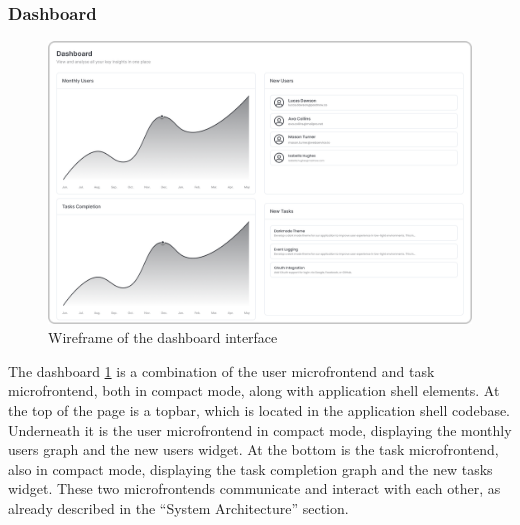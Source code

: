 \subsubsection*{Dashboard}
\begin{figure}[h]
    \centerline{\includegraphics[width=1\textwidth]{images/wireframes/dashboard.png}}
    \caption[Dashboard wireframe]{Wireframe of the dashboard interface}
    \label{fig:dashboard-wireframe}
\end{figure}
The dashboard \ref{fig:dashboard-wireframe} is a combination of the user microfrontend and task microfrontend, both in compact mode, along with application shell elements. At the top of the page is a topbar, which is located in the application shell codebase. Underneath it is the user microfrontend in compact mode, displaying the monthly users graph and the new users widget. At the bottom is the task microfrontend, also in compact mode, displaying the task completion graph and the new tasks widget. These two microfrontends communicate and interact with each other, as already described in the ``System Architecture'' section.